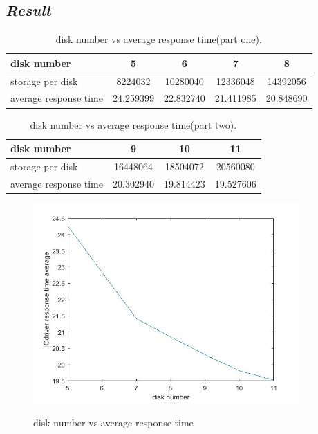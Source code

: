 \documentclass[conference]{IEEEtran}
\begin{document}
\subsection{\emph{\textbf{Result}}}
\begin{table}[H]
\centering
\begin{tabular}{lcccc}  %
\hline
disk number           &5         &6         &7         &8     \\ \hline  %
storage per disk      &8224032   &10280040  &12336048  &14392056\\ \hline        %
average response time &24.259399 &22.832740 &21.411985 &20.848690\\ \hline       %
\end{tabular}
\caption{disk number vs average response time(part one).}
\end{table}

\begin{table}[H]
\centering
\begin{tabular}{lccc}  %
\hline
disk number           &9         &10        &11          \\ \hline  %
storage per disk      &16448064  &18504072  &20560080  \\ \hline        %
average response time &20.302940 &19.814423 &19.527606 \\ \hline       %
\end{tabular}
\caption{disk number vs average response time(part two).}
\end{table}
\begin{figure}[H]
  \centering
  \includegraphics[width=4in]{result}\\
  \caption{disk number vs average response time}\label{figure1}
\end{figure}
\end{document}
